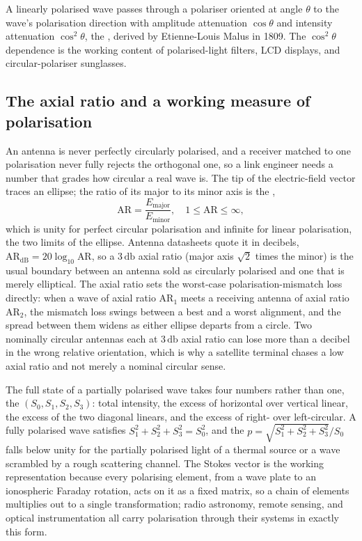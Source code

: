 
A linearly polarised wave passes through a polariser oriented at angle
$\theta$ to the wave's polarisation direction with amplitude
attenuation $\cos\theta$ and intensity attenuation $\cos^{2}\theta$,
the , derived by Etienne-Louis Malus in 1809. The
$\cos^{2}\theta$ dependence is the working content of polarised-light
filters, LCD displays, and circular-polariser sunglasses.

\subsection{The axial ratio and a working measure of polarisation}

An antenna is never perfectly circularly polarised, and a receiver
matched to one polarisation never fully rejects the orthogonal one, so a
link engineer needs a number that grades how circular a real wave is. The
tip of the electric-field vector traces an ellipse; the ratio of its major
to its minor axis is the ,
\[
\text{AR} = \frac{E_{\text{major}}}{E_{\text{minor}}}, \quad 1\le
\text{AR}\le \infty,
\]
which is unity for perfect circular polarisation and infinite for linear
polarisation, the two limits of the ellipse. Antenna datasheets quote it
in decibels, $\text{AR}_{\text{dB}} = 20\log_{10}\text{AR}$, so a
$3\,\si{\decibel}$ axial ratio (major axis $\sqrt{2}$ times the minor) is
the usual boundary between an antenna sold as circularly polarised and one
that is merely elliptical. The axial ratio sets the worst-case
polarisation-mismatch loss directly: when a wave of axial ratio
$\text{AR}_1$ meets a receiving antenna of axial ratio $\text{AR}_2$, the
mismatch loss swings between a best and a worst alignment, and the spread
between them widens as either ellipse departs from a circle. Two
nominally circular antennas each at $3\,\si{\decibel}$ axial ratio can lose
more than a decibel in the wrong relative orientation, which is why a
satellite terminal chases a low axial ratio and not merely a nominal
circular sense.

The full state of a partially polarised wave takes four numbers rather
than one, the  $(S_0, S_1, S_2, S_3)$: total
intensity, the excess of horizontal over vertical linear, the excess of
the two diagonal linears, and the excess of right- over left-circular. A
fully polarised wave satisfies $S_1^2 + S_2^2 + S_3^2 = S_0^2$, and the
 $p = \sqrt{S_1^2 + S_2^2 + S_3^2}/S_0$
falls below unity for the partially polarised light of a thermal source or
a wave scrambled by a rough scattering channel. The Stokes vector is the
working representation because every polarising element, from a wave plate
to an ionospheric Faraday rotation, acts on it as a fixed matrix, so a
chain of elements multiplies out to a single transformation; radio
astronomy, remote sensing, and optical instrumentation all carry
polarisation through their systems in exactly this form.

